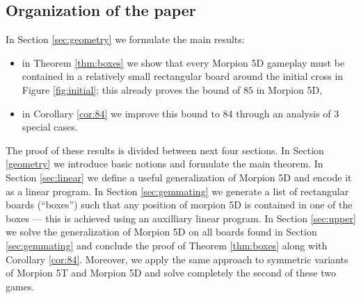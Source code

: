 
\subsection{Organization of the paper}
In Section \ref{sec:geometry} we formulate the main results:
\begin{itemize}
\item in Theorem \ref{thm:boxes} we show that every Morpion 5D gameplay must be contained in a relatively small rectangular board around the initial cross in Figure \ref{fig:initial}; this already proves the bound of $85$ in Morpion 5D,
\item in Corollary \ref{cor:84} we improve this bound to 84 through an analysis of $3$ special cases.
\end{itemize}
The proof of these results is divided between next four sections. In Section \ref{geometry} we introduce basic notions and formulate the main theorem. In Section \ref{sec:linear} we define a useful generalization of Morpion 5D  and encode it as a linear program. In Section \ref{sec:gemmating} we generate a list of rectangular boards (``boxes'') such that any position of morpion 5D is contained in one of the boxes --- this is achieved using an auxilliary linear program. In Section \ref{sec:upper} we solve 
the generalization of Morpion 5D on all boards found in Section \ref{sec:gemmating} and conclude the proof of Theorem \ref{thm:boxes} along with Corollary \ref{cor:84}. Moreover, we apply the same approach to symmetric variants of Morpion 5T and Morpion 5D and solve completely the second of these
two games.


